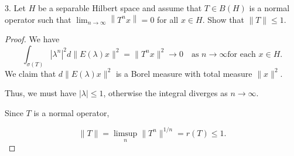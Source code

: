 \begin{problem}
	3. Let $H$ be a separable Hilbert space and assume that $T \in B(H)$ is a normal operator such that $\lim _{n \rightarrow \infty}\left\|T^n x\right\|=0$ for all $x \in H$. Show that $\|T\| \leq 1$.
\end{problem}
\begin{proof}
	We have
	\[
		\int _{\sigma(T)} \left| \lambda^n \right| ^2 d \|E(\lambda) x\|^2 = \|T^n x\|^2 \to 0 \quad \text{as } n \to \infty \text{for each }x \in H
	.\] 
	We claim that $d \|E(\lambda) x\|^2$ is a Borel measure with total measure $\|x\|^2$. 

	Thus, we must have $\left| \lambda \right| \le 1$, otherwise the integral diverges as $n \to \infty $.

	Since $T$ is a normal operator,

	\[
		\|T\| = \limsup_n \|T^n\|^{1 / n} = r(T) \le 1
	.\] 
\end{proof}


